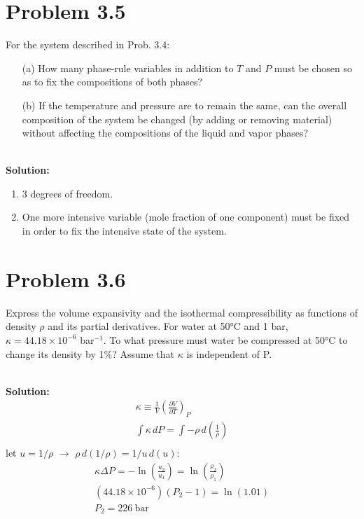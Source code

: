 \documentclass{article}
\newenvironment{solution}{\par\noindent\textbf{\\Solution:\\}}{\par\medskip}
\begin{document}
\section*{Problem 3.5}
For the system described in Prob. 3.4:
\begin{enumerate}
      \item[(a)] How many phase-rule variables in addition to $T$ and $P$ must be chosen so as to fix the compositions of both phases?
      \item[(b)] If the temperature and pressure are to remain the same, can the overall composition of the system be changed (by adding or removing material) without affecting the compositions of the liquid and vapor phases?
\end{enumerate}

\begin{solution}
\begin{enumerate}[label=(\alph*)]
      \item 3 degrees of freedom.
      \item One more intensive variable (mole fraction of one component) must be fixed in order to fix the intensive state of the system.
\end{enumerate}
\end{solution}


\section*{Problem 3.6}
Express the volume expansivity and the isothermal compressibility as functions of density $\rho$ and its partial derivatives. For water at 50°C and 1 bar, $\kappa = 44.18 \times 10^{-6}$ bar$^{-1}$. To what pressure must water be compressed at 50°C to change its density by 1\%? Assume that $\kappa$ is independent of P.

\begin{solution}
\begin{gather*}
\kappa\equiv\frac{1}{V}\left( \frac{\partial V}{\partial T} \right)_{P} \\
\int \kappa \, dP = \int -\rho \, d\left( \frac{1}{\rho} \right) \\
\end{gather*}
let $u=1/\rho$ \quad $\to$ \quad  $\rho\,d\left( 1/\rho \right)=1/u\,d\left( u \right)$:
\begin{gather*}
\kappa\Delta P = -\ln\left( \frac{u_{2}}{u_{1}} \right)= \ln\left( \frac{\rho_{2}}{\rho_{1}} \right) \\
\left( 44.18\times10^{-6} \right)\left( P_{2}-1 \right)= \ln\left( 1.01 \right) \\
\boxed{ P_{2}=226~\unit{ \bar } }
\end{gather*}
\end{solution}
\end{document}
